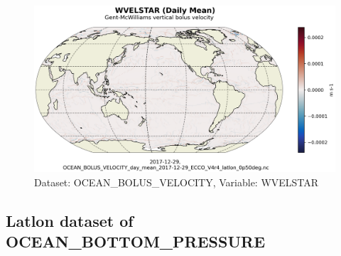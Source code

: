 \begin{figure}[H]
\centering
\includegraphics[scale=0.55]{../images/plots/latlon_plots/Gent-McWilliams_Ocean_Bolus_Velocity/WVELSTAR.png}
\caption{Dataset: OCEAN\_BOLUS\_VELOCITY, Variable: WVELSTAR}
\label{tab:table-OCEAN_BOLUS_VELOCITY_WVELSTAR-Plot}
\end{figure}
\subsection{Latlon dataset of OCEAN\_BOTTOM\_PRESSURE}
\newp
